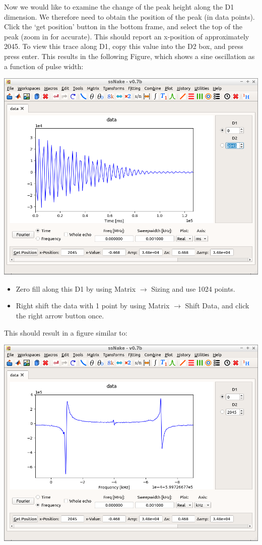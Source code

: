 \documentclass[11pt,a4paper]{article}
\begin{document}
Now we would like to examine the change of the peak height along the D1 dimension.
We therefore need to obtain the position of the peak (in data points).
Click the `get position' button in the bottom frame, and select the top of the peak (zoom in for accurate).
This should report an x-position of approximately 2045.
To view this trace along D1, copy this value into the D2 box, and press press enter.
This results in the following Figure, which shows a sine oscillation as a function of pulse width:
\begin{center}
\includegraphics[width=0.8\linewidth]{Figs/Fig2.png}
\end{center}


\begin{itemize}
\item Zero fill along this D1 by using Matrix $\longrightarrow$ Sizing and use 1024 points.
\item Right shift the data with 1 point by using Matrix $\longrightarrow$ Shift Data, and click the right arrow button once. 
\end{itemize}
This should result in a figure similar to:
\begin{center}
\includegraphics[width=0.8\linewidth]{Figs/Fig3.png}
\end{center}
\end{document}
